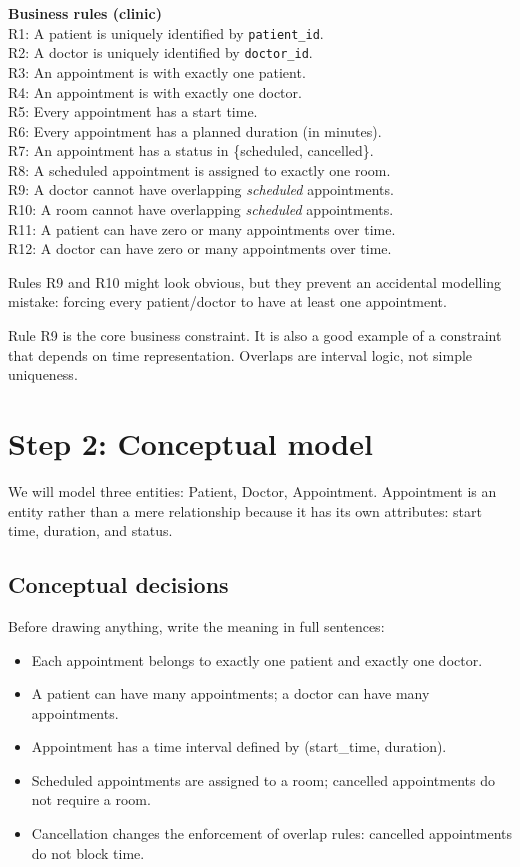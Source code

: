 \begin{examplebox}
\textbf{Business rules (clinic)}\\
R1: A patient is uniquely identified by \texttt{patient\_id}.\\
R2: A doctor is uniquely identified by \texttt{doctor\_id}.\\
R3: An appointment is with exactly one patient.\\
R4: An appointment is with exactly one doctor.\\
R5: Every appointment has a start time.\\
R6: Every appointment has a planned duration (in minutes).\\
R7: An appointment has a status in \{scheduled, cancelled\}.\\
R8: A scheduled appointment is assigned to exactly one room.\\
R9: A doctor cannot have overlapping \emph{scheduled} appointments.\\
R10: A room cannot have overlapping \emph{scheduled} appointments.\\
R11: A patient can have zero or many appointments over time.\\
R12: A doctor can have zero or many appointments over time.
\end{examplebox}

Rules R9 and R10 might look obvious, but they prevent an accidental modelling mistake:
forcing every patient/doctor to have at least one appointment.

Rule R9 is the core business constraint.
It is also a good example of a constraint that depends on time representation.
Overlaps are interval logic, not simple uniqueness.

\section{Step 2: Conceptual model}
We will model three entities: Patient, Doctor, Appointment.
Appointment is an entity rather than a mere relationship because it has its own attributes: start time, duration, and status.

\subsection{Conceptual decisions}
Before drawing anything, write the meaning in full sentences:
\begin{itemize}
  \item Each appointment belongs to exactly one patient and exactly one doctor.
  \item A patient can have many appointments; a doctor can have many appointments.
  \item Appointment has a time interval defined by (start\_time, duration).
  \item Scheduled appointments are assigned to a room; cancelled appointments do not require a room.
  \item Cancellation changes the enforcement of overlap rules: cancelled appointments do not block time.
\end{itemize}

